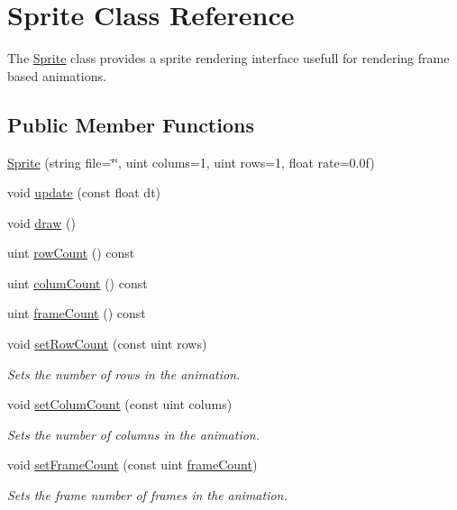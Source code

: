 \hypertarget{class_sprite}{\section{Sprite Class Reference}
\label{class_sprite}
}


The \hyperlink{class_sprite}{Sprite} class provides a sprite rendering interface usefull for rendering frame based animations.  


\subsection*{Public Member Functions}
\begin{DoxyCompactItemize}
\item 
\hyperlink{class_sprite_ae08edbad269fa82f92fb079a2cfde4ac}{Sprite} (string file=\char`\"{}\char`\"{}, uint colums=1, uint rows=1, float rate=0.\-0f)
\item 
void \hyperlink{class_sprite_ad699a2cd7f6d40ec378b1a2681690274}{update} (const float dt)
\item 
void \hyperlink{class_sprite_a56c5cf8a568cff737ff95520cbe6b405}{draw} ()
\item 
uint \hyperlink{class_sprite_a07c962e1c17fb932958eab07e44ea2b7}{row\-Count} () const 
\item 
uint \hyperlink{class_sprite_a306b817179c9b200b5d6ae7277941ee8}{colum\-Count} () const 
\item 
uint \hyperlink{class_sprite_ac69667630245a46bae799de33a1b68a6}{frame\-Count} () const 
\item 
void \hyperlink{class_sprite_a9fd6928865d11cb8f1691d1ad016bfb0}{set\-Row\-Count} (const uint rows)
\begin{DoxyCompactList}\small\item\em Sets the number of rows in the animation. \end{DoxyCompactList}\item 
void \hyperlink{class_sprite_a8aa120b7fcf6090f9a75524d6605845f}{set\-Colum\-Count} (const uint colums)
\begin{DoxyCompactList}\small\item\em Sets the number of columns in the animation. \end{DoxyCompactList}\item 
void \hyperlink{class_sprite_a7d9fae90437e77abf2e661787f04b7ce}{set\-Frame\-Count} (const uint \hyperlink{class_sprite_ac69667630245a46bae799de33a1b68a6}{frame\-Count})
\begin{DoxyCompactList}\small\item\em Sets the frame number of frames in the animation. \end{DoxyCompactList}\item 

\end{DoxyCompactItemize}
